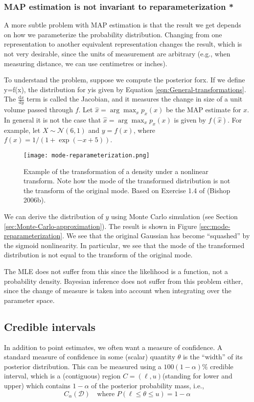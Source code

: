 \subsubsection{MAP estimation is not invariant to reparameterization *}
A more subtle problem with MAP estimation is that the result we get depends on how we parameterize the probability distribution. Changing from one representation to another equivalent representation changes the result, which is not very desirable, since the units of measurement are arbitrary (e.g., when measuring distance, we can use centimetres or inches).

To understand the problem, suppose we compute the posterior forx. If we define y=f(x), the distribution for yis given by Equation \ref{eqn:General-transformations}. The $\frac{\mathrm{d}x}{\mathrm{d}y}$ term is called the Jacobian, and it measures the change in size of a unit volume passed
through $f$. Let $\hat{x}=\arg\max_x p_x(x)$ be the MAP estimate for $x$. In general it is not the case that $\hat{x}=\arg\max_x p_x(x)$ is given by $f(\hat{x})$. For example, let $X \sim \mathcal{N}(6,1)$ and $y=f(x)$, where $f(x)=1/(1+\exp(-x+5))$. 

\begin{figure}[hbtp]
\centering
    \texttt{[image: mode-reparameterization.png]}
\caption{Example of the transformation of a density under a nonlinear transform. Note how the mode of the transformed distribution is not the transform of the original mode. Based on Exercise 1.4 of (Bishop 2006b).}
\label{fig:mode-reparameterization} 
\end{figure}

We can derive the distribution of $y$ using Monte Carlo simulation (see Section \ref{sec:Monte-Carlo-approximation}). The result is shown in Figure \ref{sec:mode-reparameterization}. We see that the original Gaussian has become “squashed” by the sigmoid nonlinearity. In particular, we see that the mode of the transformed distribution is not equal to the transform of the original mode.

The MLE does not suffer from this since the likelihood is a function, not a probability density. Bayesian inference does not suffer from this problem either, since the change of measure is taken into account when integrating over the parameter space.


\subsection{Credible intervals}
\label{sec:Credible-intervals}
In addition to point estimates, we often want a measure of confidence. A standard measure of confidence in some (scalar) quantity $\theta$ is the “width” of its posterior distribution. This can be measured using a $100(1−\alpha)\%$ credible interval, which is a (contiguous) region $C=(\ell,u)$(standing for lower and upper) which contains $1−\alpha$ of the posterior probability mass, i.e.,
\begin{equation}
C_{\alpha}(\mathcal{D}) \quad \text{where } P(\ell \leq \theta \leq u)=1-\alpha
\end{equation}


